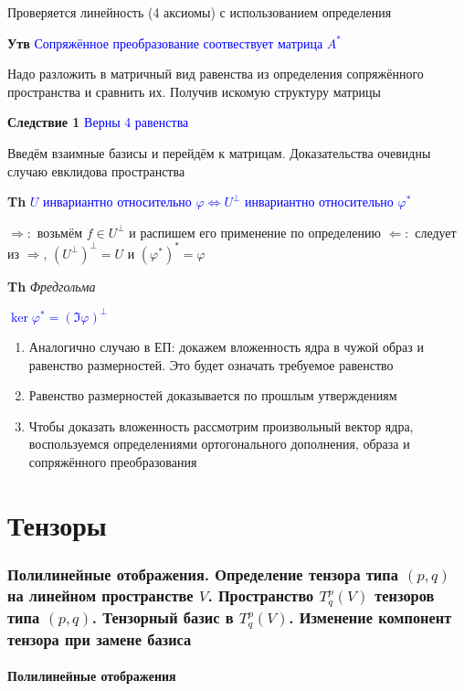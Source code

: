 \documentclass[a4paper, 14pt]{article}
\begin{document}
    Проверяется линейность (4 аксиомы) с использованием определения

    \textbf{Утв} \textcolor{blue}{Сопряжённое преобразование соотвествует матрица $A^*$}

    Надо разложить в матричный вид равенства из определения сопряжённого пространства и сравнить их.
    Получив искомую структуру матрицы

    \textbf{Следствие 1} \textcolor{blue}{Верны 4 равенства}

    Введём взаимные базисы и перейдём к матрицам.
    Доказательства очевидны случаю евклидова пространства

    \textbf{Th} \textcolor{blue}{$U$ инвариантно относительно $\varphi \Leftrightarrow U^\bot$ инвариантно относительно $\varphi^*$}

    $\Rightarrow:$ возьмём $f \in U^\bot$ и распишем его применение по определению
    $\Leftarrow:$ следует из $\Rightarrow$, $(U^\bot)^\bot = U$ и $(\varphi^*)^* = \varphi$

    \textbf{Th} \textit{Фредгольма}

    \textcolor{blue}{$\ker \varphi^* = (\Im \varphi)^\bot$}

    \begin{enumerate}
        \item Аналогично случаю в ЕП: докажем вложенность ядра в чужой образ и равенство размерностей.
        Это будет означать требуемое равенство
        \item Равенство размерностей доказывается по прошлым утверждениям
        \item Чтобы доказать вложенность рассмотрим произвольный вектор ядра, воспользуемся определениями
        ортогонального дополнения, образа и сопряжённого преобразования
    \end{enumerate}

     \part*{Тензоры}

    \section{Полилинейные отображения.
    Определение тензора типа $(p,q)$ на линейном пространстве $V$.
    Пространство $T^p_q (V)$ тензоров типа $(p,q)$.
    Тензорный базис в $T^p_q (V)$.
    Изменение компонент тензора при замене базиса}

    \subsection{Полилинейные отображения}
\end{document}
